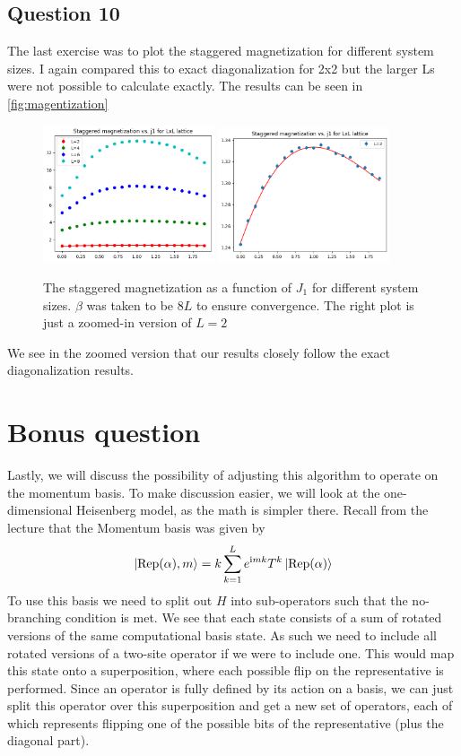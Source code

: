 \documentclass[ngerman]{scrartcl}
\begin{document}
\subsection*{Question 10}
The last exercise was to plot the staggered magnetization for different system sizes. I again compared this to exact diagonalization for 2x2 but the larger Ls were not possible to calculate exactly. The results can be seen in \ref{fig:magentization}
\begin{figure}[H]
        \centering
        \includegraphics[width=0.45\textwidth]{magnetization.png}
        \includegraphics[width=0.45\textwidth]{zoomed_magnetization.png}
        \caption{The staggered magnetization as a function of $J_1$ for different system sizes. $\beta$ was taken to be $8L$ to ensure convergence. The right plot is just a zoomed-in version of $L=2$}
        \label{fig:magnetization}
    \end{figure}
We see in the zoomed version that our results closely follow the exact diagonalization results.
\section*{Bonus question}
Lastly, we will discuss the possibility of adjusting this algorithm to operate on the momentum basis. To make discussion easier, we will look at the one-dimensional Heisenberg model, as the math is simpler there. Recall from the lecture that the Momentum basis was given by
\begin{align*}
    \ket{\text{Rep}(\alpha),m}=k\sum_{k=1}^L e^{\text{i}mk}T^k\ket{\text{Rep}(\alpha)}
\end{align*}
To use this basis we need to split out $H$ into sub-operators such that the no-branching condition is met. We see that each state consists of a sum of rotated versions of the same computational basis state. As such we need to include all rotated versions of a two-site operator if we were to include one. This would map this state onto a superposition, where each possible flip on the representative is performed. Since an operator is fully defined by its action on a basis, we can just split this operator over this superposition and get a new set of operators, each of which represents flipping one of the possible bits of the representative (plus the diagonal part).
\end{document}
